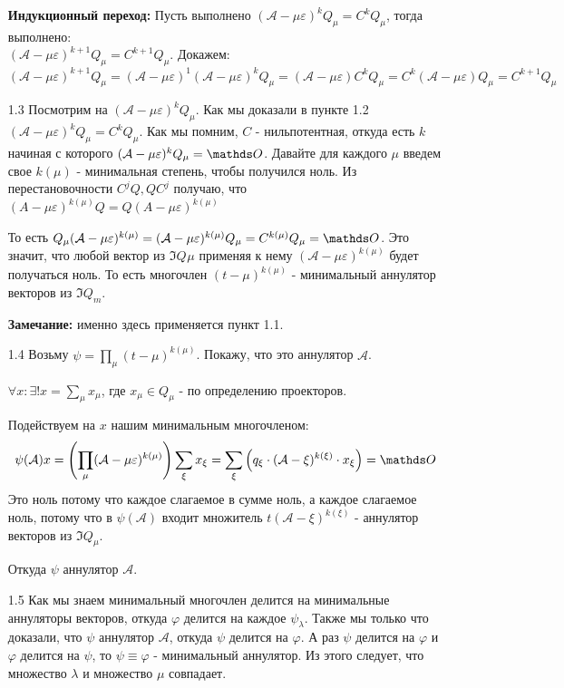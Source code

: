 \begin{enumerate}
    \textbf{Индукционный переход:} Пусть выполнено $(\mathcal{A-\mu\varepsilon})^kQ_{\mu} = C^kQ_{\mu}$,  тогда выполнено:\\
    $(\mathcal{A-\mu\varepsilon})^{k+1}Q_{\mu} = C^{k+1}Q_{\mu}$. Докажем:
    $$(\mathcal{A-\mu\varepsilon})^{k+1}Q_{\mu}  = (\mathcal{A-\mu\varepsilon})^{1}(\mathcal{A-\mu\varepsilon})^{k}Q_{\mu} = (\mathcal{A-\mu\varepsilon}) C^kQ_{\mu} = C^k(\mathcal{A-\mu\varepsilon})Q_{\mu} = C^{k+1}Q_{\mu}$$
    
    \item[1.3] Посмотрим на $(\mathcal{A}-\mu \varepsilon)^k Q_{\mu}$. Как мы доказали в пункте 1.2 $(\mathcal{A}-\mu \varepsilon)^k Q_{\mu}= C^{k}Q_{\mu}$. Как мы помним, $C$ - нильпотентная, откуда есть $k$ начиная с которого  $(\mathcal{A}-\mu \varepsilon)^k Q_{\mu} = \zero$. Давайте для каждого $\mu$ введем свое $k(\mu)$ - минимальная степень, чтобы получился ноль. Из перестановочности $C^jQ, QC^j$ получаю, что $(A-\mu\varepsilon)^{k(\mu)}Q =Q(A-\mu\varepsilon)^{k(\mu)} $

    То есть $Q_{\mu}(\mathcal{A}-\mu \varepsilon)^{k(\mu)} =(\mathcal{A}-\mu \varepsilon)^{k(\mu)}Q_{\mu}=C^{k(\mu)}Q_{\mu}=\zero$. Это значит, что любой вектор из $\Im Q_{}\mu$ применяя к нему $(\mathcal{A}-\mu \varepsilon)^{k(\mu)}$  будет получаться ноль.
    То есть многочлен $(t-\mu)^{k(\mu)}$ - минимальный аннулятор векторов из $\Im Q_m$. 

    \textbf{Замечание:}  именно здесь применяется пункт 1.1.

    \item[1.4] Возьму $\psi = \prod\limits_{\mu}(t-\mu)^{k(\mu)}$. Покажу, что это аннулятор $\mathcal{A}$. 

    $\forall x: \exists!x = \sum\limits_{\mu}x_{\mu} $, где $x_{\mu} \in Q_{\mu}$ - по определению проекторов.

    Подействуем на $x$ нашим минимальным многочленом:
    $$\psi(\mathcal{A})x = \left( \prod\limits_{\mu}(\mathcal{A}-\mu \varepsilon)^{k(\mu)}\right)\sum\limits_{\xi}x_{\xi} =\sum\limits_{\xi}\left( q_{\xi}\cdot(\mathcal{A}-\xi)^{k(\xi)} \cdot x_{\xi}\right) = \zero $$
    Это ноль потому что каждое слагаемое в сумме ноль, а каждое слагаемое ноль, потому что в $\psi(\mathcal{A})$ входит множитель $t(\mathcal{A}-\xi)^{k(\xi)}$ - аннулятор векторов из $\Im Q_\mu$.

    Откуда $\psi$ аннулятор $\mathcal{A}$.
    \item[1.5] Как мы знаем минимальный многочлен делится на минимальные аннуляторы векторов, откуда $\varphi $ делится на каждое $\psi_{\lambda}$. Также мы только что доказали, что $\psi$ аннулятор $\mathcal{A}$, откуда $\psi$ делится на $\varphi$. А раз  $\psi$ делится на $\varphi$ и $\varphi$ делится на $\psi$, то $\psi \equiv \varphi $ - минимальный аннулятор. Из этого следует, что множество $\lambda$ и множество $\mu$ совпадает.


\end{enumerate}
